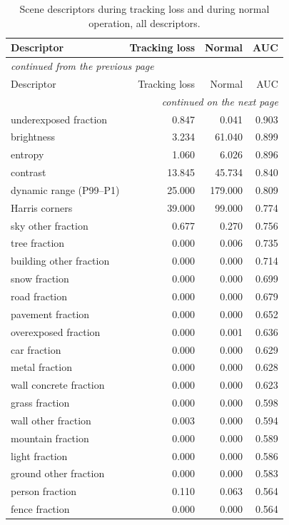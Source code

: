 \documentclass[11pt,a4paper]{article}
\begin{document}
\begin{longtable}{lrrr}
\caption{Scene descriptors during tracking loss and during normal operation, all descriptors.}\label{tab:S1}\\
\toprule
Descriptor & Tracking loss & Normal & AUC \\
\midrule
\endfirsthead
\multicolumn{4}{l}{\footnotesize\itshape continued from the previous page}\\
\toprule
Descriptor & Tracking loss & Normal & AUC \\
\midrule
\endhead
\midrule
\multicolumn{4}{r}{\footnotesize\itshape continued on the next page}\\
\endfoot
\bottomrule
\endlastfoot
underexposed fraction & 0.847 & 0.041 & 0.903 \\
brightness & 3.234 & 61.040 & 0.899 \\
entropy & 1.060 & 6.026 & 0.896 \\
contrast & 13.845 & 45.734 & 0.840 \\
dynamic range (P99--P1) & 25.000 & 179.000 & 0.809 \\
Harris corners & 39.000 & 99.000 & 0.774 \\
sky other fraction & 0.677 & 0.270 & 0.756 \\
tree fraction & 0.000 & 0.006 & 0.735 \\
building other fraction & 0.000 & 0.000 & 0.714 \\
snow fraction & 0.000 & 0.000 & 0.699 \\
road fraction & 0.000 & 0.000 & 0.679 \\
pavement fraction & 0.000 & 0.000 & 0.652 \\
overexposed fraction & 0.000 & 0.001 & 0.636 \\
car fraction & 0.000 & 0.000 & 0.629 \\
metal fraction & 0.000 & 0.000 & 0.628 \\
wall concrete fraction & 0.000 & 0.000 & 0.623 \\
grass fraction & 0.000 & 0.000 & 0.598 \\
wall other fraction & 0.003 & 0.000 & 0.594 \\
mountain fraction & 0.000 & 0.000 & 0.589 \\
light fraction & 0.000 & 0.000 & 0.586 \\
ground other fraction & 0.000 & 0.000 & 0.583 \\
person fraction & 0.110 & 0.063 & 0.564 \\
fence fraction & 0.000 & 0.000 & 0.564 \\

\end{longtable}
\end{document}
